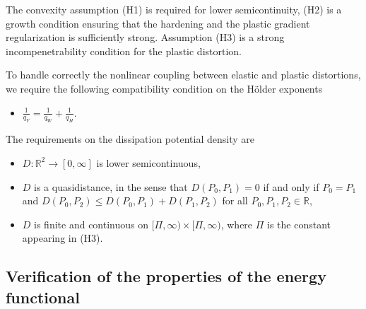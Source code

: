 \documentclass[a4paper,10pt,twoside]{amsbook}
\numberwithin{section}{chapter}
\numberwithin{equation}{chapter}
\theoremstyle{definition}
\begin{document}
The convexity assumption (H1) is required for lower semicontinuity, (H2) is a growth condition ensuring that the hardening and the plastic gradient regularization is sufficiently strong. Assumption (H3) is a strong incompenetrability condition for the plastic distortion.

To handle correctly the nonlinear coupling between elastic and plastic distortions, we require the following compatibility condition on the H\"older exponents
\begin{itemize}
\item[(\"O)] $\frac{1}{q_Y}=\frac{1}{q_W}+\frac{1}{q_H}$.
\end{itemize}

The requirements on the dissipation potential density are
\begin{itemize}[itemsep=1em]
\item[(D1)] $D\colon\mathbb{R}^2\to[0,\infty]$ is lower semicontinuous,
\item[(D2)] $D$ is a quasidistance, in the sense that $D(P_0,P_1)=0$ if and only if $P_0=P_1$ and $D(P_0,P_2)\le D(P_0,P_1)+D(P_1,P_2)$ for all $P_0,P_1,P_2\in\mathbb{R}$,
\item[(D2)] $D$ is finite and continuous on $[\Pi,\infty)\times[\Pi,\infty)$, where $\Pi$ is the constant appearing in (H3).
\end{itemize}

\subsection{Verification of the properties of the energy functional}
\end{document}
